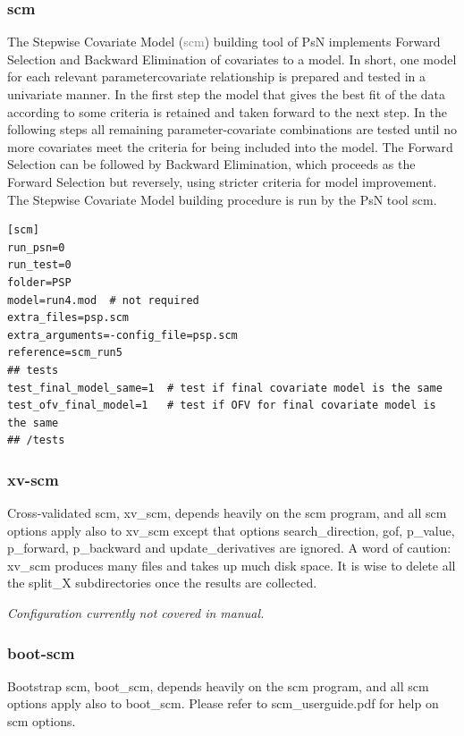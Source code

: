 \documentclass[a4,11pt]{report} \usepackage[pdftex]{graphicx}
\newcommand{\psn}[1]{\textcolor{Grey}{#1}}
\begin{document}
\subsubsection{scm}
The Stepwise Covariate Model (\psn{scm}) building tool of PsN
implements Forward Selection and Backward Elimination of covariates to
a model. In short, one model for each relevant parametercovariate
relationship is prepared and tested in a univariate manner. In the
first step the model that gives the best fit of the data according to
some criteria is retained and taken forward to the next step. In the
following steps all remaining parameter-covariate combinations are
tested until no more covariates meet the criteria for being included
into the model. The Forward Selection can be followed by Backward
Elimination, which proceeds as the Forward Selection but reversely,
using stricter criteria for model improvement. The Stepwise Covariate
Model building procedure is run by the PsN tool scm.

\begin{lstlisting}
[scm]
run_psn=0
run_test=0
folder=PSP
model=run4.mod  # not required
extra_files=psp.scm
extra_arguments=-config_file=psp.scm
reference=scm_run5
## tests
test_final_model_same=1  # test if final covariate model is the same
test_ofv_final_model=1   # test if OFV for final covariate model is
the same
## /tests
\end{lstlisting}

\subsubsection{xv-scm}
Cross-validated scm, xv\_scm, depends heavily on the scm program, and
all scm options apply also to xv\_scm except that options
search\_direction, gof, p\_value, p\_forward, p\_backward and
update\_derivatives are ignored. A word of caution: xv\_scm produces
many files and takes up much disk space. It is wise to delete all the
split\_X subdirectories once the results are collected.

\vspace{10pt}

\noindent \textit{Configuration currently not covered in manual.}

\subsubsection{boot-scm}
Bootstrap scm, boot\_scm, depends heavily on the scm program, and all
scm options apply also to boot\_scm. Please refer to
scm\_userguide.pdf for help on scm options.
\end{document}
